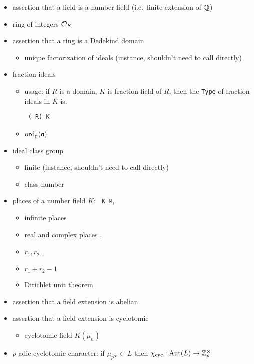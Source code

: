 \begin{itemize}
\item
assertion that a field is a number field (i.e.~finite extension of ${\mathbb {Q}}$)
\item
ring of integers ${\mathcal {O}}_K$ 
\item
assertion that a ring is a Dedekind domain 
\begin{itemize}
\item
unique factorization of ideals 
(instance, shouldn't need to call directly)
\end{itemize}
\item
fraction ideals 
\begin{itemize}
\item
usage: if $R$ is a domain, $K$ is fraction field of $R$,
then the \verb|Type| of fraction ideals in $K$ is:

\verb| (|\verb| R) K|
\item
$\operatorname{ord}_{\mathfrak{p}}({\mathfrak{a}})$ 
\end{itemize}
\item
ideal class group 
\begin{itemize}
\item
finite 
(instance, shouldn't need to call directly)
\item
class number 
\end{itemize}
\item
places of a number field $K$:
\verb| K ℝ|, 
\begin{itemize}
\item
infinite places 
\item
real and complex places
,
\item
$r_1,r_2$
,
\item
$r_1+r_2-1$
\item
Dirichlet unit theorem
\end{itemize}
\item
assertion that a field extension is abelian
\item
assertion that a field extension is cyclotomic
\begin{itemize}
\item
cyclotomic field $K(\mu_n)$
\end{itemize}
\item
$p$-adic cyclotomic character:
if $\mu_{p^\infty}\subset L$
then $\chi_{\mathrm{cyc}}:{\mathrm{Aut}}(L)\to{\mathbb {Z}}_p^\times$
\end{itemize}
